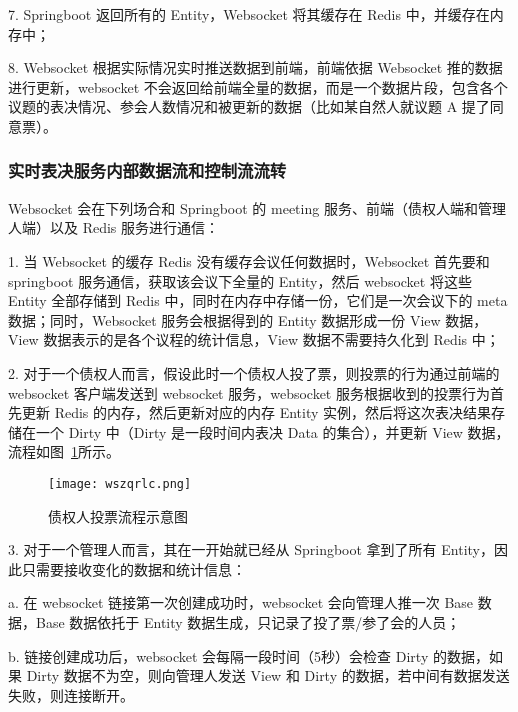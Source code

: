   \quad{}7. Springboot 返回所有的 Entity，Websocket 将其缓存在 Redis 中，并缓存在内存中；
  
  \quad{}8. Websocket 根据实际情况实时推送数据到前端，前端依据 Websocket 推的数据进行更新，websocket 不会返回给前端全量的数据，而是一个数据片段，包含各个议题的表决情况、参会人数情况和被更新的数据（比如某自然人就议题 A 提了同意票）。

  \subsubsection{实时表决服务内部数据流和控制流流转}
  Websocket 会在下列场合和 Springboot 的 meeting 服务、前端（债权人端和管理人端）以及 Redis 服务进行通信：

  \quad{}1. 当 Websocket 的缓存 Redis 没有缓存会议任何数据时，Websocket 首先要和 springboot 服务通信，获取该会议下全量的 Entity，然后 websocket 将这些 Entity 全部存储到 Redis 中，同时在内存中存储一份，它们是一次会议下的 meta 数据；同时，Websocket 服务会根据得到的 Entity 数据形成一份 View 数据，View 数据表示的是各个议程的统计信息，View 数据不需要持久化到 Redis 中；
  
  \quad{}2. 对于一个债权人而言，假设此时一个债权人投了票，则投票的行为通过前端的 websocket 客户端发送到 websocket 服务，websocket 服务根据收到的投票行为首先更新 Redis 的内存，然后更新对应的内存 Entity 实例，然后将这次表决结果存储在一个 Dirty 中（Dirty 是一段时间内表决 Data 的集合），并更新 View 数据，流程如图~\ref{fig:wszqrlc}所示。

  \begin{figure}[!htp]
      \centering
      \texttt{[image: wszqrlc.png]}
      \caption{债权人投票流程示意图}
      \label{fig:wszqrlc}
    \end{figure}

  \quad{}3. 对于一个管理人而言，其在一开始就已经从 Springboot 拿到了所有 Entity，因此只需要接收变化的数据和统计信息：

  \quad{}\quad{}a. 在 websocket 链接第一次创建成功时，websocket 会向管理人推一次 Base 数据，Base 数据依托于 Entity 数据生成，只记录了投了票/参了会的人员；

  \quad{}\quad{}b. 链接创建成功后，websocket 会每隔一段时间（5秒）会检查 Dirty 的数据，如果 Dirty 数据不为空，则向管理人发送 View 和 Dirty 的数据，若中间有数据发送失败，则连接断开。
